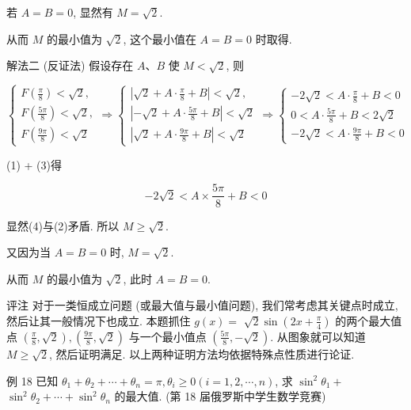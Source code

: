 	若 $A=B=0$, 显然有 $M=\sqrt{2}$.

	从而 $M$ 的最小值为 $\sqrt{2}$, 这个最小值在 $A=B=0$ 时取得.

	解法二 (反证法) 假设存在 $A 、 B$ 使 $M<\sqrt{2}$, 则

	\[
		\left\{\begin{array} { l }
			{ F ( \frac { \pi } { 8 } ) < \sqrt { 2 } , }  \tag{1} \\
			{ F ( \frac { 5 \pi } { 8 } ) < \sqrt { 2 } , }        \\
			{ F ( \frac { 9 \pi } { 8 } ) < \sqrt { 2 } }
		\end{array} \Rightarrow \left\{\begin{array} { l }
			{ | \sqrt { 2 } + A \cdot \frac { \pi } { 8 } + B | < \sqrt { 2 } , }   \\
			{ | - \sqrt { 2 } + A \cdot \frac { 5 \pi } { 8 } + B | < \sqrt { 2 } } \\
			{ | \sqrt { 2 } + A \cdot \frac { 9 \pi } { 8 } + B | < \sqrt { 2 } }
		\end{array} \Rightarrow \left\{\begin{array}{l}
			-2 \sqrt{2}<A \cdot \frac{\pi}{8}+B<0  \\
			0<A \cdot \frac{5 \pi}{8}+B<2 \sqrt{2} \\
			-2 \sqrt{2}<A \cdot \frac{9 \pi}{8}+B<0
		\end{array}\right.\right.\right.
	\]

	(1) + (3)得


	\begin{equation*}
		-2 \sqrt{2}<A \times \frac{5 \pi}{8}+B<0 \tag{4}
	\end{equation*}


	显然(4)与(2)矛盾. 所以 $M \geqslant \sqrt{2}$.

	又因为当 $A=B=0$ 时, $M=\sqrt{2}$.

	从而 $M$ 的最小值为 $\sqrt{2}$, 此时 $A=B=0$.

	评注 对于一类恒成立问题 (或最大值与最小值问题), 我们常考虑其关键点时成立, 然后让其一般情况下也成立. 本题抓住 $g(x)=$ $\sqrt{2} \sin \left(2 x+\frac{\pi}{4}\right)$ 的两个最大值点 $\left(\frac{\pi}{8}, \sqrt{2}\right),\left(\frac{9 \pi}{8}, \sqrt{2}\right)$ 与一个最小值点 $\left(\frac{5 \pi}{8},-\sqrt{2}\right)$. 从图象就可以知道 $M \geqslant \sqrt{2}$, 然后证明满足. 以上两种证明方法均依据特殊点性质进行论证.

	例 18 已知 $\theta_{1}+\theta_{2}+\cdots+\theta_{n}=\pi, \theta_{i} \geqslant 0(i=1,2, \cdots, n)$, 求 $\sin ^{2} \theta_{1}+$ $\sin ^{2} \theta_{2}+\cdots+\sin ^{2} \theta_{n}$ 的最大值. (第 18 届俄罗斯中学生数学竞赛)

